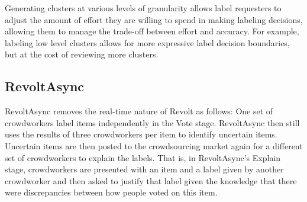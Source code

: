 Generating clusters at various levels of granularity allows label requesters to adjust the amount of effort they are willing to spend in making labeling decisions, allowing them to manage the trade-off between effort and accuracy. For example, labeling low level clusters allows for more expressive label decision boundaries, but at the cost of reviewing more clusters. 





\subsection{RevoltAsync}
RevoltAsync removes the real-time nature of Revolt as follows: One set of crowdworkers label items independently in the Vote stage. RevoltAsync then still uses the results of three crowdworkers per item to identify uncertain items. Uncertain items are then posted to the crowdsourcing market again for a different set of crowdworkers to explain the labels. That is, in RevoltAsync's Explain stage, crowdworkers are presented with an item and a label given by another crowdworker and then asked to justify that label given the knowledge that there were discrepancies between how people voted on this item.

